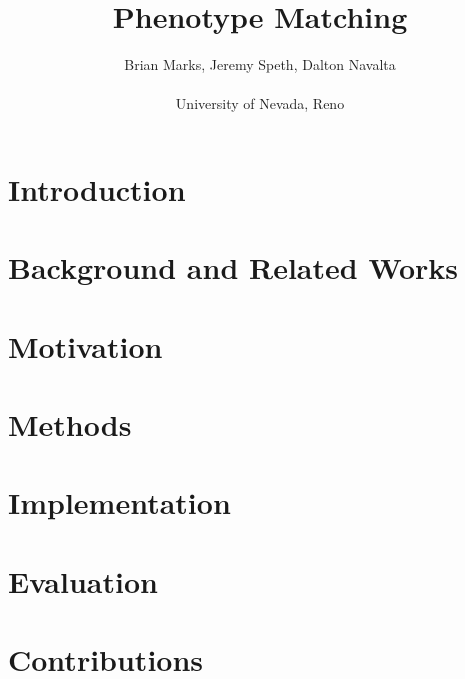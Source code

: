 \documentclass{sig-alternate}
\begin{document}
\title{Phenotype Matching}
\author{Brian Marks, Jeremy Speth, Dalton Navalta \\\\ University of Nevada, Reno}
\date{}

\maketitle
\begin{abstract}
 
\end{abstract}

\category{}{}{}


\terms{}

\keywords{}

\section{Introduction}

\section{Background and Related Works}

\section{Motivation}

\section{Methods}

\section{Implementation}

\section{Evaluation}

\section{Contributions}
\end{document}

